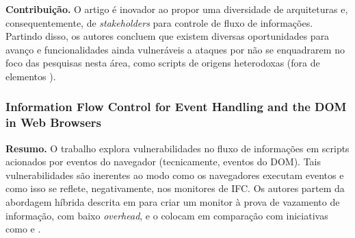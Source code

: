 \textbf{Contribuição.} O artigo é inovador ao propor uma diversidade de arquiteturas e, consequentemente, de \textit{stakeholders} para controle de fluxo de informações. Partindo disso, os autores concluem que existem diversas oportunidades para avanço e funcionalidades ainda vulneráveis a ataques por não se enquadrarem no foco das pesquisas nesta área, como scripts de origens heterodoxas (fora de elementos ).


\subsubsection{Information Flow Control for Event Handling and the DOM in Web Browsers \cite{Rajani2015}}
\textbf{Resumo.} O trabalho explora vulnerabilidades no fluxo de informações em scripts acionados por eventos do navegador (tecnicamente, eventos do DOM). Tais vulnerabilidades são inerentes ao modo como os navegadores executam eventos e como isso se reflete, negativamente, nos monitores de IFC. Os autores partem da abordagem híbrida descrita em \cite{Bichhawat2014} para criar um monitor à prova de vazamento de informação, com baixo \textit{overhead}, e o colocam em comparação com iniciativas como \cite{Stefan2014} e \cite{Hedin2014}.
